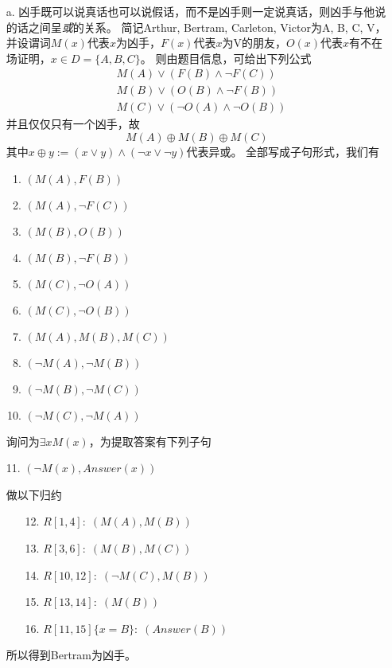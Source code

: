 \documentclass[a4paper, 11pt]{article}
\begin{document}
\begin{answer}
\begin{itemize}
    \item [a.] 凶手既可以说真话也可以说假话，而不是凶手则一定说真话，则凶手与他说的话之间呈\emph{或}的关系。
    简记Arthur, Bertram, Carleton, Victor为A, B, C, V，并设谓词$M(x)$代表$x$为凶手，$F(x)$代表$x$为V的朋友，$O(x)$代表$x$有不在场证明，$x\in D=\{A,B,C\}$。
    则由题目信息，可给出下列公式
    \[\begin{aligned}
        & M(A)\lor(F(B)\land\lnot F(C))\\
        & M(B)\lor(O(B)\land\lnot F(B))\\
        & M(C)\lor(\lnot O(A)\land\lnot O(B))
    \end{aligned}\]
    并且仅仅只有一个凶手，故
    \[M(A)\oplus M(B)\oplus M(C)\]
    其中$x \oplus y:=(x\lor y)\land(\lnot x\lor\lnot y)$代表异或。
    全部写成子句形式，我们有
    \begin{enumerate}
        \item $(M(A),F(B))$
        \item $(M(A),\lnot F(C))$
        \item $(M(B),O(B))$
        \item $(M(B),\lnot F(B))$
        \item $(M(C),\lnot O(A))$
        \item $(M(C),\lnot O(B))$
        \item $(M(A), M(B), M(C))$
        \item $(\lnot M(A), \lnot M(B))$
        \item $(\lnot M(B), \lnot M(C))$
        \item $(\lnot M(C), \lnot M(A))$
    \end{enumerate}
    询问为$\exists xM(x)$，为提取答案有下列子句
    \begin{flushleft}
        11. $(\lnot M(x),Answer(x))$
    \end{flushleft}
    做以下归约
    \begin{enumerate}
        \item[12.] $R[1,4]:\;(M(A),M(B))$
        \item[13.] $R[3,6]:\;(M(B),M(C))$
        \item[14.] $R[10,12]:\;(\lnot M(C),M(B))$
        \item[15.] $R[13,14]:\;(M(B))$
        \item[16.] $R[11,15]\{x=B\}:\;(Answer(B))$
    \end{enumerate}
    所以得到Bertram为凶手。

\end{itemize}
\end{answer}
\end{document}

